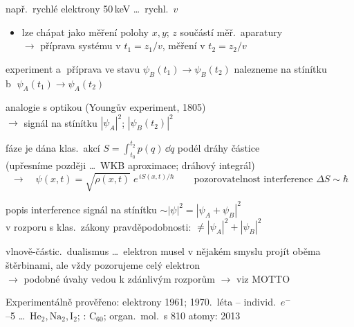 \documentclass[11pt,a4paper]{article}
\begin{document}
např.\ rychlé elektrony 50\,keV \dots\ rychl.\ $v$
\begin{itemize}[nosep]
  \item lze chápat jako měření polohy $x, y$; $z$ součástí měř.\ aparatury \\
        $\to$ příprava systému v $t_1 = z_1/v$, \quad měření v $t_2 = z_2/v$
\end{itemize}

experiment \textcircled{a} příprava ve stavu \quad $\psi_B(t_1) \to \psi_B(t_2)$ \quad nalezneme na stínítku \\
\phantom{experiment} \textcircled{b} \phantom{příprava ve stavu} \quad $\psi_A(t_1) \to \psi_A(t_2)$

analogie s optikou (Youngův experiment, 1805) \\
\quad $\to$ signál na stínítku \quad $|\psi_A|^2$; \quad $|\psi_B(t_2)|^2$

fáze je dána klas.\ akcí \quad $S = \displaystyle\int_{t_0}^{t_2} p(q)\,\dd q$ \quad podél dráhy částice \\
(upřesníme později \dots\ WKB aproximace; dráhový integrál)
\[
  \to\quad \psi(x,t) = \sqrt{\rho(x,t)}\;e^{\,iS(x,t)/\hbar}
  \qquad\text{pozorovatelnost interference } \Delta S \sim \hbar
\]

popis interference \quad signál na stínítku $\sim |\psi|^2 = |\psi_A + \psi_B|^2$ \\
\quad v rozporu s klas.\ zákony pravděpodobnosti: \quad $\neq |\psi_A|^2 + |\psi_B|^2$

vlnově-částic.\ dualismus \dots\ elektron musel v nějakém smyslu projít oběma štěrbinami, ale vždy pozorujeme celý elektron \\
$\to$ podobné úvahy vedou k zdánlivým rozporům \quad $\to$ viz MOTTO

Experimentálně prověřeno: elektrony 1961; 1970.\ léta -- individ.\ $e^-$ \\
--5 \dots\ $\mathrm{He}_2, \mathrm{Na}_2, \mathrm{I}_2$; : $\mathrm{C}_{60}$; \quad organ.\ mol.\ s 810 atomy: 2013
\end{document}
